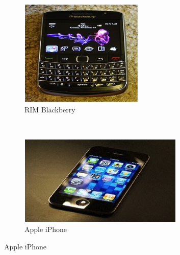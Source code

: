 \documentclass[12pt, a4paper, twoside]{book}
\begin{document}
\begin{figure}[htb]
        \centering
        \begin{subfigure}[b]{0.3\textwidth}
                \includegraphics[width=\textwidth]{images/rim-blackberry}
                \caption{RIM Blackberry}
                \label{fig:rim-blackberry}
        \end{subfigure}%
        ~ %
        \begin{subfigure}[b]{0.3\textwidth}
                \includegraphics[width=\textwidth]{images/apple-iphone}
                \caption{Apple iPhone}
                \label{fig:apple-iPhone}
        \end{subfigure}

\end{figure}
\end{document}
